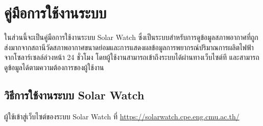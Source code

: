 \chapter{คู่มือการใช้งานระบบ}












ในส่วนนี้จะเป็นคู่มือการใช้งานระบบ Solar Watch ซึ่งเป็นระบบสำหรับการดูข้อมูลสภาพอากาศที่ถูกส่งมากจากสถานีวัดสภาพอากาศขนาดย่อมและการแสดงผลข้อมูลการพยากรณ์ปริมาณการผลิตไฟฟ้าจากโซลาร์เซลล์ล่วงหน้า 24 ชั่วโมง โดยผู้ใช้งานสามารถเข้าถึงระบบได้ผ่านทางเว็บไซต์ที และสามารถดูข้อมูลได้ตามความต้องการของผู้ใช้งาน

\section{วิธีการใช้งานระบบ Solar Watch}

ผู้ใช้เข้าสู่เว็บไซต์ของระบบ Solar Watch ที่ \url{https://solarwatch.cpe.eng.cmu.ac.th/}


